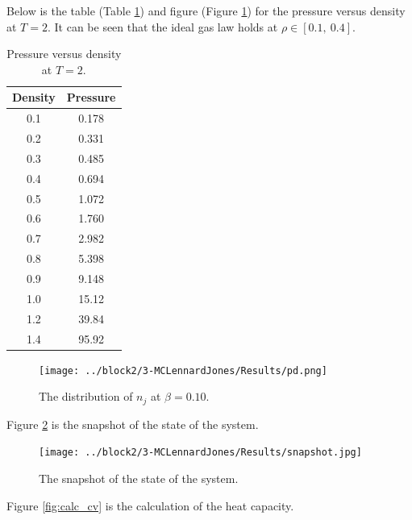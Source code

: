 \documentclass{assignmeownt}
\begin{document}
Below is the table (Table \ref{tab:ideal_gas}) and figure (Figure \ref{fig:ideal_gas}) for the pressure versus density at $T=2$. It can be seen that the ideal gas law holds at $\rho \in [0.1,\ 0.4]$.
\begin{table}[]
    \centering
    \caption[]{Pressure versus density at $T=2$.}
    
    \begin{tabular}{@{}cc@{}}
    \toprule
    Density & Pressure \\ 
    \midrule
    0.1     & 0.178    \\
    0.2     & 0.331    \\
    0.3     & 0.485    \\
    0.4     & 0.694    \\
    0.5     & 1.072    \\
    0.6     & 1.760    \\
    0.7     & 2.982   \\
    0.8     & 5.398   \\
    0.9     & 9.148   \\
    1.0     & 15.12   \\
    1.2     & 39.84   \\
    1.4     & 95.92   \\
    \bottomrule
    \end{tabular}
    \label{tab:ideal_gas}
\end{table}

\begin{figure}
    \centering
    \texttt{[image: ../block2/3-MCLennardJones/Results/pd.png]}
    \caption{The distribution of $n_j$ at $\beta=0.10$.}
    \label{fig:ideal_gas}
\end{figure}


Figure \ref{fig:snapshot} is the snapshot of the state of the system.

\begin{figure}
    \centering
    \texttt{[image: ../block2/3-MCLennardJones/Results/snapshot.jpg]}
    \caption{The snapshot of the state of the system.}
    \label{fig:snapshot}
\end{figure}

Figure \ref{fig:calc_cv} is the calculation of the heat capacity.
\end{document}
